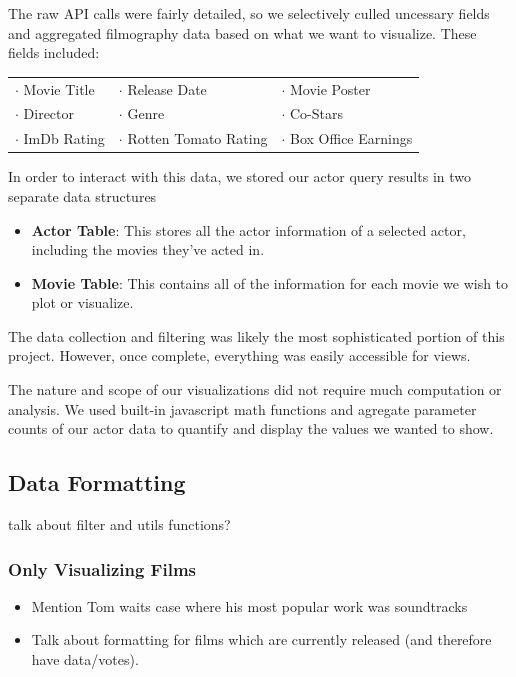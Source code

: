 \documentclass[12pt]{article}
\begin{document}
	The raw API calls were fairly detailed, so we selectively culled uncessary fields and aggregated filmography data based on what we want to visualize. These fields included:
	
	\begin{center}
	\begin{tabular}{lll}
	$\cdot$ Movie Title & $\cdot$ Release Date & $\cdot$ Movie Poster\\
	$\cdot$ Director  & $\cdot$ Genre & $\cdot$ Co-Stars\\
	$\cdot$ ImDb Rating & $\cdot$ Rotten Tomato Rating & $\cdot$ Box Office Earnings\\
	\end{tabular}
	\end{center}
	
	In order to interact with this data, we stored our actor query results in two separate data structures
	\begin{itemize}
		\item \textbf{Actor Table}: This stores all the actor information of a selected actor, including the movies they've acted in.
		\item \textbf{Movie Table}: This contains all of the information for each movie we wish to plot or visualize.
	\end{itemize}

	The data collection and filtering was likely the most sophisticated portion of this project. However, once complete, everything was easily accessible for views.  
	
	The nature and scope of our visualizations did not require much computation or analysis.  We used built-in javascript math functions and agregate parameter counts of our actor data to quantify and display the values we wanted to show.

\subsection{Data Formatting}

talk about filter and utils functions?
\subsubsection{Only Visualizing Films}
	
	\begin{itemize}
			\item Mention Tom waits case where his most popular work was soundtracks
			\item Talk about formatting for films which are currently released (and therefore have data/votes).
	\end{itemize}
	
\end{document}
